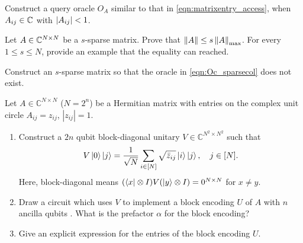 \begin{exer}
Construct a query oracle $O_A$ similar to that in \cref{eqn:matrixentry_access}, when $A_{ij}\in\mathbb{C}$ with $\left\lvert A_{ij}\right\rvert< 1$.
\end{exer}

\begin{exer}\label{exer:A_spec_max_norm}
  Let $A\in\mathbb{C}^{N\times N}$ be a $s$-sparse matrix. Prove that $\left\lVert A\right\rVert\le s \left\lVert A\right\rVert_{\max}$. For every $1\le s \le N$, provide an example that the equality can reached.
\end{exer}

\begin{exer}
  Construct an $s$-sparse matrix so that the oracle in \cref{eqn:Oc_sparsecol} does not exist.
\end{exer}


\begin{exer}
Let $A\in\mathbb{C}^{N\times N}$ ($N=2^n$) be a Hermitian matrix with entries on the complex unit circle $A_{ij}=z_{ij}$, $|z_{ij}|=1$.
\begin{enumerate}
    \item
    Construct a $2n$ qubit block-diagonal unitary $V\in\mathbb C^{N^2\times N^2}$ such that 
\[
V\ket{0}\ket{j}=\frac1{\sqrt N}\sum_{i\in[N]}\sqrt{\bar z_{ij}}\ket{i}\ket{j}, \quad j\in [N].
\]
Here, block-diagonal means $(\bra{x}\otimes I)V(\ket{y}\otimes I)=0^{N\times N}$ for $x\ne y$.
    \item
    Draw a circuit which uses $V$ to implement a block encoding $U$ of $A$ with $n$ ancilla qubits . What is the prefactor $\alpha$ for the block encoding?
    \item
    Give an explicit expression for the entries of the block encoding $U$.
    \end{enumerate}
\end{exer}

